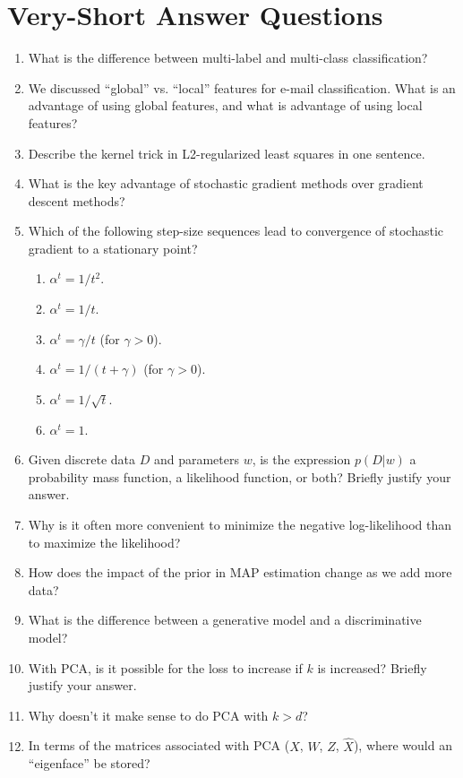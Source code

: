 \documentclass{article}
\def\enum#1{\begin{enumerate}#1\end{enumerate}}
\begin{document}
\pagebreak

\section{Very-Short Answer Questions}


\enum{
\item What is the difference between multi-label and multi-class classification?
\item We discussed ``global'' vs. ``local'' features for e-mail classification. What is an advantage of using global features, and what is advantage of using local features?
\item Describe the kernel trick in L2-regularized least squares in one sentence.
\item What is the key advantage of stochastic gradient methods over gradient descent methods?
\item Which of the following step-size sequences lead to convergence of stochastic gradient to a stationary point?
\enum{
\item $\alpha^t = 1/t^2$.
\item $\alpha^t = 1/t$.
\item $\alpha^t = \gamma/t$ (for $\gamma > 0$).
\item $\alpha^t = 1/(t+\gamma)$ (for $\gamma > 0$).
\item $\alpha^t = 1/\sqrt{t}$.
\item $\alpha^t = 1$.
}
\item{Given discrete data $D$ and parameters $w$, is the expression $p(D|w)$ a probability mass function, a likelihood function, or both? Briefly justify your answer.}
\item{Why is it often more convenient to minimize the negative log-likelihood than to maximize the likelihood?}
\item How does the impact of the prior in MAP estimation change as we add more data?
\item What is the difference between a generative model and a discriminative model?
\item With PCA, is it possible for the loss to increase if $k$ is increased? Briefly justify your answer.
\item Why doesn't it make sense to do PCA with $k > d$?
\item In terms of the matrices associated with PCA ($X$, $W$, $Z$, $\hat{X}$), where would an ``eigenface'' be stored?
}
\end{document}
